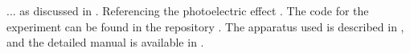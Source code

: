 \documentclass[%
 sor,
 jor,
 amsmath,amssymb,
 reprint,%
]{revtex4-2}
\begin{document}
... as discussed in \cite{PrestonDietzErrorAnalysis}.
\cite{PrestonDietzErrorAnalysis}
Referencing the photoelectric effect \cite{wiki_photoelectric}. The code for the experiment can be found in the repository \cite{github_code}. The apparatus used is described in \cite{ses_apparatus}, and the detailed manual is available in \cite{fsu_manual}.






\end{document}
